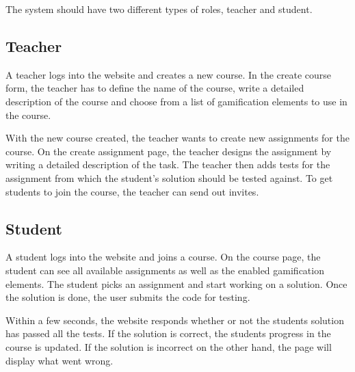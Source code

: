 The system should have two different types of roles, teacher and student.

\subsection*{Teacher}
A teacher logs into the website and creates a new course. In the create course form, the teacher has to define the name of the course, write a detailed description of the course and choose from a list of gamification elements to use in the course. 

With the new course created, the teacher wants to create new assignments for the course. On the create assignment page, the teacher designs the assignment by writing a detailed description of the task. The teacher then adds tests for the assignment from which the student's solution should be tested against. To get students to join the course, the teacher can send out invites.

\subsection*{Student}
A student logs into the website and joins a course. On the course page, the student can see all available assignments as well as the enabled gamification elements. The student picks an assignment and start working on a solution. Once the solution is done, the user submits the code for testing.

Within a few seconds, the website responds whether or not the students solution has passed all the tests. If the solution is correct, the students progress in the course is updated. If the solution is incorrect on the other hand, the page will display what went wrong.